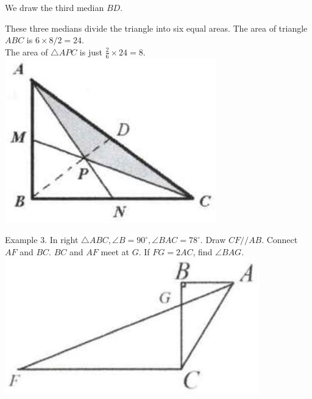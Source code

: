 \documentclass[10pt]{article}
\begin{document}
We draw the third median \(B D\).

These three medians divide the triangle into six equal areas. The area of triangle \(A B C\) is \(6 \times 8 / 2=24\).\\
The area of \(\triangle A P C\) is just \(\frac{2}{6} \times 24=8\).\\
\includegraphics[max width=\textwidth, center]{2025_04_17_97bc1f7e44d93c271a88g-009}

Example 3. In right \(\triangle A B C, \angle B=90^{\circ}, \angle B A C=78^{\circ}\). Draw \(C F / / A B\). Connect \(A F\) and \(B C\). \(B C\) and \(A F\) meet at \(G\). If \(F G=2 A C\), find \(\angle B A G\).\\
\includegraphics[max width=\textwidth, center]{2025_04_17_97bc1f7e44d93c271a88g-009(2)}
\end{document}
